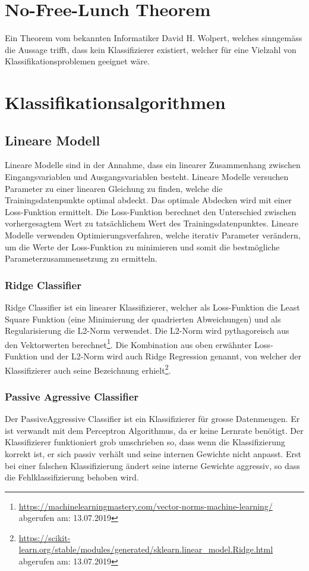 \section{No-Free-Lunch Theorem}\label{sec:nofreelunch}
Ein Theorem vom bekannten Informatiker David H. Wolpert, welches sinngemäss die Aussage trifft, dass kein Klassifizierer existiert, welcher für eine Vielzahl von Klassifikationsproblemen geeignet wäre\cite[p.]{Wolpert1996TheLO}.

\section{Klassifikationsalgorithmen}\label{sec:algos}
\subsection{Lineare Modell}
Lineare Modelle sind in der Annahme, dass ein linearer Zusammenhang zwischen Eingangsvariablen und Ausgangsvariablen besteht.
Lineare Modelle versuchen Parameter zu einer linearen Gleichung zu finden, welche die Trainingsdatenpunkte optimal abdeckt.
Das optimale Abdecken wird mit einer Loss-Funktion ermittelt.
Die Loss-Funktion berechnet den Unterschied zwischen vorhergesagtem Wert zu tatsächlichem Wert des Trainingsdatenpunktes.
Lineare Modelle verwenden Optimierungsverfahren, welche iterativ Parameter verändern, um die Werte der Loss-Funktion zu minimieren und somit die bestmögliche Parameterzusammensetzung zu ermitteln.
\subsubsection{Ridge Classifier}
Ridge Classifier ist ein linearer Klassifizierer, welcher als Loss-Funktion die \glqq Least Square\grqq{} Funktion (eine Minimierung der quadrierten Abweichungen) und als Regularisierung die L2-Norm verwendet. Die L2-Norm wird pythagoreisch aus den Vektorwerten berechnet\footnote{\url{https://machinelearningmastery.com/vector-norms-machine-learning/} abgerufen am: 13.07.2019}.
Die Kombination aus oben erwähnter Loss-Funktion und der L2-Norm wird auch \glqq Ridge Regression\grqq{} genannt, von welcher der Klassifizierer auch seine Bezeichnung erhielt\footnote{\url{https://scikit-learn.org/stable/modules/generated/sklearn.linear_model.Ridge.html} abgerufen am: 13.07.2019}\cite{scikit-learn}.
\subsubsection{Passive Agressive Classifier}
Der PassiveAggressive Classifier ist ein Klassifizierer für grosse Datenmengen.
Er ist verwandt mit dem Perceptron Algorithmus, da er keine Lernrate benötigt.
Der Klassifizierer funktioniert grob umschrieben so, dass wenn die Klassifizierung korrekt ist, er sich passiv verhält und seine internen Gewichte nicht anpasst.
Erst bei einer falschen Klassifizierung ändert seine interne Gewichte aggressiv, so dass die Fehlklassifizierung behoben wird\cite{crammer2006online}.
